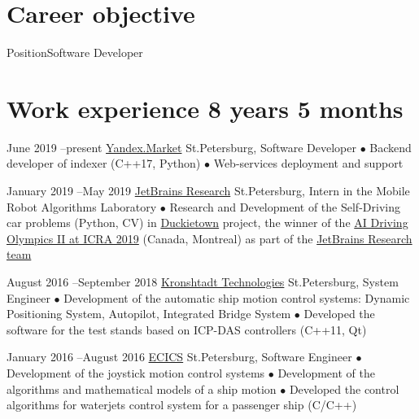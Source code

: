 \documentclass[11pt,a4paper]{moderncv}
\def\mark{{\tiny$\bullet$} }
\begin{document}
\maketitle

\section{Career objective}
\cvline
    {Position}{Software Developer}

\section{Work experience 8 years 5 months} %
\cventry
    {June 2019 --\newline present} %
    {\href{https://market.yandex.ru/}{Yandex.Market}}
    {St.Petersburg, Software Developer}
    {}
    {}
    {
        \mark Backend developer of indexer (C++17, Python)
        \newline
        \mark Web-services deployment and support
    }

\cventry
    {January 2019 --\newline May 2019} %
    {\href{https://research.jetbrains.org/groups/robolab} {JetBrains Research}}
    {St.Petersburg, Intern in the Mobile Robot Algorithms Laboratory}
    {}
    {}
    {
        \mark Research and Development of the Self-Driving car problems (Python, CV) in
        {\href{https://www.duckietown.org/archives/37690}{Duckietown}} project,
        the winner of the {\href{https://www.icra2019.org/competitions/ai-driving-olympics-ai-do}
        {AI Driving Olympics II at ICRA 2019}} (Canada, Montreal) as part of the
        \href{https://research.jetbrains.org/ru/news/the-team-jbrrussia-won-ai-driving-olympics-at-icra2019}
        {JetBrains Research team}
    }

\cventry
    {August 2016 --\newline September 2018} %
    {\href{https://kronshtadt.ru/}{Kronshtadt Technologies}}
    {St.Petersburg, System Engineer}
    {}
    {}
    {
        \mark Development of the automatic ship motion control systems:
              Dynamic Positioning System, Autopilot, Integrated Bridge System
        \newline
        \mark Developed the software for the test stands based on ICP-DAS controllers (C++11, Qt)
    }

\cventry
    {January 2016 --\newline August 2016} %
    {\href{http://www.ec-ics.ru/}{ECICS}}
    {St.Petersburg, Software Engineer}
    {}
    {}
    {
        \mark Development of the joystick motion control systems
        \newline
        \mark Development of the algorithms and mathematical models of a ship motion
        \newline
        \mark Developed the control algorithms for waterjets control system for a passenger ship (C/C++)
    }
\end{document}
